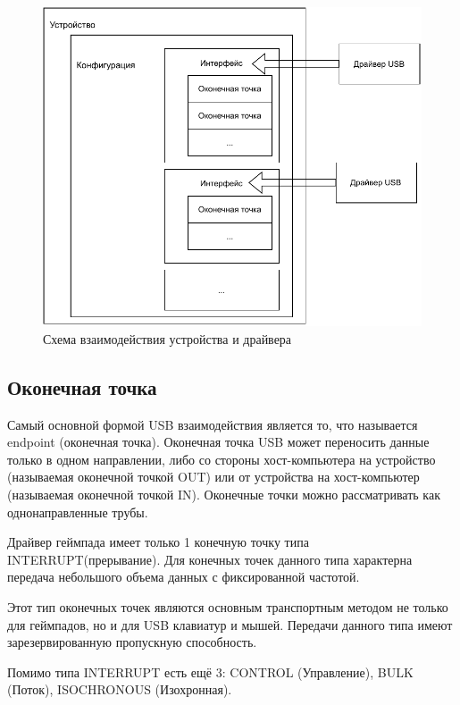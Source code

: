 \begin{figure}[h!]
	\centering
	\includegraphics[scale=0.9]{img/Usb-device.pdf}
	\caption{Схема взаимодействия устройства и драйвера}
	\label{USB-device}
\end{figure}\par

\subsection{Оконечная точка}
Самый основной формой USB взаимодействия является то, что называется endpoint
(оконечная точка). Оконечная точка USB может переносить данные только в одном
направлении, либо со стороны хост-компьютера на устройство (называемая оконечной точкой
OUT) или от устройства на хост-компьютер (называемая оконечной точкой IN). Оконечные
точки можно рассматривать как однонаправленные трубы.\par
Драйвер геймпада имеет только 1 конечную точку типа INTERRUPT(прерывание). Для
конечных точек данного типа характерна передача небольшого объема данных
с фиксированной частотой.\par Этот тип оконечных точек являются основным транспортным методом не только для
геймпадов, но и для USB клавиатур и мышей.
Передачи данного типа имеют зарезервированную пропускную способность. \par
Помимо типа INTERRUPT есть ещё 3:  CONTROL (Управление), BULK (Поток),  ISOCHRONOUS (Изохронная).\par

